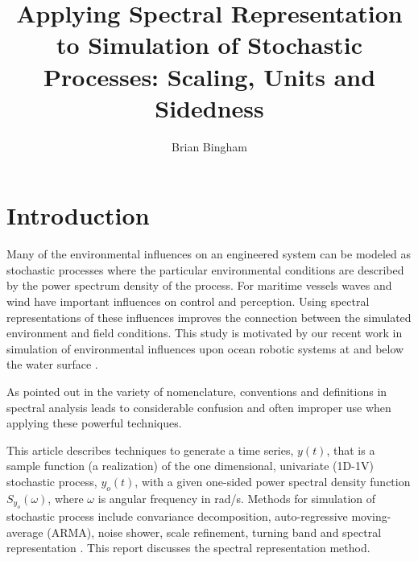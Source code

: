 \documentclass[techreport, article]{npsreport2018}
\title{Applying Spectral Representation to Simulation of Stochastic Processes: Scaling, Units and Sidedness}
\author{Brian Bingham}
\begin{document}
\NPScover                  %
\NPSsftne                  %
\NPSabstractpage           %
\newcommand{\SF}{0.7}
\newcommand{\SFb}{0.45}
\newcommand{\SFPic}{0.45}
\newcommand{\SFPlot}{0.45}
\newcommand{\SFc}{0.52}
\newcommand{\FigWidth}{\SF}


%
%

\NPSbody

\section{Introduction}
Many of the environmental influences on an engineered system can be modeled as stochastic processes where the particular environmental conditions are described by the power spectrum density of the process.  For maritime vessels waves and wind have important influences on control and perception.  Using spectral representations of these influences improves the connection between the simulated environment and field conditions.  This study is motivated by our recent work in simulation of environmental influences upon ocean robotic systems at and below the water surface \cite{bingham2019maritime, zhang22dave, choi22fasterrohtua}.

As pointed out in \cite{barbour15normalization} the variety of nomenclature, conventions and definitions in spectral analysis leads to considerable confusion and often improper use when applying these powerful techniques.

This article describes techniques to generate a time series, $y(t)$, that is a sample function (a realization) of the one dimensional, univariate (1D-1V) stochastic process, $y_o(t)$, with a given one-sided power spectral density function $S_{y_{o}}(\omega)$, where $\omega$ is angular frequency in \unit[]{rad/s}.  %
Methods for simulation of stochastic process include convariance decomposition, auto-regressive moving-average (ARMA), noise shower, scale refinement, turning band and spectral representation \cite{cao00simulation}.  This report discusses the spectral representation method.
\end{document}
